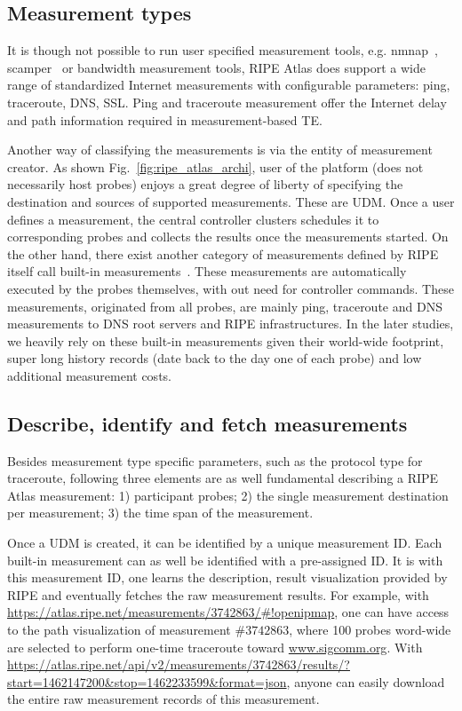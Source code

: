 \subsection{Measurement types}
It is though not possible to run user specified measurement tools, e.g. nmnap~\cite{nmap}, scamper~\cite{luckie2010scamper} or bandwidth measurement tools, RIPE Atlas does support a wide range of standardized Internet measurements with configurable parameters: ping, traceroute, DNS, SSL.
Ping and traceroute measurement offer the Internet delay and path information required in measurement-based TE.

Another way of classifying the measurements is via the entity of measurement creator. As shown Fig.~\ref{fig:ripe_atlas_archi}, user of the platform (does not necessarily host probes) enjoys a great degree of 
liberty of specifying the destination and sources of supported measurements. These are \acf{UDM}. Once a user defines a measurement, the central controller clusters schedules it to corresponding probes and collects the results once the measurements started.
On the other hand, there exist another category of measurements defined by RIPE itself call built-in measurements~\cite{atlas}. These measurements are automatically executed by the probes themselves, with out need for controller commands. These measurements, originated from all probes, are mainly ping, traceroute and DNS measurements to DNS root servers and RIPE infrastructures.
In the later studies, we heavily rely on these built-in measurements given their world-wide footprint, super long history records (date back to the day one of each probe) and low additional measurement costs.

\subsection{Describe, identify and fetch measurements}
Besides measurement type specific parameters, such as the protocol type for traceroute, following three elements are as well fundamental describing a RIPE Atlas measurement: 1) participant probes; 2) the single measurement destination per measurement; 3) the time span of the measurement. 

Once a \ac{UDM} is created, it can be identified by a unique measurement ID. 
Each built-in measurement can as well be identified with a pre-assigned ID.
It is with this measurement ID, one learns the description, result visualization provided by RIPE and eventually fetches the raw measurement results.
For example, with \url{https://atlas.ripe.net/measurements/3742863/#!openipmap}, one can have access to the path visualization of measurement $\#3742863$, where 100 probes word-wide are selected to perform one-time traceroute toward \url{www.sigcomm.org}. With \url{https://atlas.ripe.net/api/v2/measurements/3742863/results/?start=1462147200&stop=1462233599&format=json}, anyone can easily download the entire raw measurement records of this measurement.

